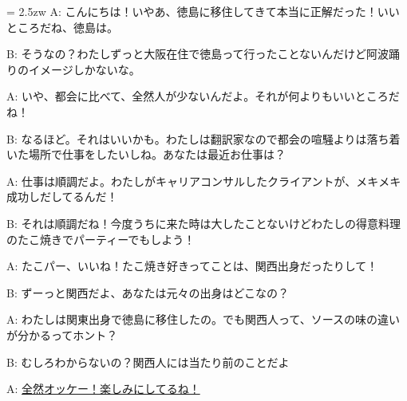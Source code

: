 \documentclass[11pt]{amsart}
\title{}
\author{}
\newenvironment{hangall}[1]{\hangindent = 2.5zw\everypar{\hangindent = 2.5zw}}{}
\begin{document}
\maketitle
\begin{hangall}{}%
A: こんにちは！いやあ、徳島に移住してきて本当に正解だった！いいところだね、徳島は。

B: そうなの？わたしずっと大阪在住で徳島って行ったことないんだけど阿波踊りのイメージしかないな。

A: いや、都会に比べて、全然人が少ないんだよ。それが何よりもいいところだね！

B: なるほど。それはいいかも。わたしは翻訳家なので都会の喧騒よりは落ち着いた場所で仕事をしたいしね。あなたは最近お仕事は？

A: 仕事は順調だよ。わたしがキャリアコンサルしたクライアントが、メキメキ成功しだしてるんだ！

B: それは順調だね！今度うちに来た時は大したことないけどわたしの得意料理のたこ焼きでパーティーでもしよう！

A: たこパー、いいね！たこ焼き好きってことは、関西出身だったりして！

B: ずーっと関西だよ、あなたは元々の出身はどこなの？

A: わたしは関東出身で徳島に移住したの。でも関西人って、ソースの味の違いが分かるってホント？

B: むしろわからないの？関西人には当たり前のことだよ

A: \ul{全然オッケー！楽しみにしてるね！}\end{hangall}
\end{document}
